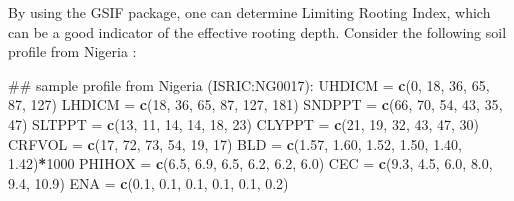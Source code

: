 \documentclass[11pt]{krantz}
\newenvironment{Shaded}{\begin{snugshade}}{\end{snugshade}}
\newcommand{\DecValTok}[1]{\textcolor[rgb]{0.06,0.06,0.06}{#1}}
\newcommand{\FloatTok}[1]{\textcolor[rgb]{0.06,0.06,0.06}{#1}}
\newcommand{\KeywordTok}[1]{\textcolor[rgb]{0.27,0.27,0.27}{\textbf{#1}}}
\newcommand{\NormalTok}[1]{#1}
\newcommand{\OperatorTok}[1]{\textcolor[rgb]{0.43,0.43,0.43}{\textbf{#1}}}
\newcommand{\StringTok}[1]{\textcolor[rgb]{0.5,0.5,0.5}{#1}}
\theoremstyle{definition}
\theoremstyle{definition}
\theoremstyle{definition}
\theoremstyle{remark}
\begin{document}
By using the GSIF package, one can determine Limiting Rooting Index,
which can be a good indicator of the effective rooting depth. Consider
the following soil profile from Nigeria \citep{Leenaars2012}:

\begin{Shaded}
\begin{Highlighting}[]
\NormalTok{## sample profile from Nigeria (ISRIC:NG0017):}
\NormalTok{UHDICM =}\StringTok{ }\KeywordTok{c}\NormalTok{(}\DecValTok{0}\NormalTok{, }\DecValTok{18}\NormalTok{, }\DecValTok{36}\NormalTok{, }\DecValTok{65}\NormalTok{, }\DecValTok{87}\NormalTok{, }\DecValTok{127}\NormalTok{)}
\NormalTok{LHDICM =}\StringTok{ }\KeywordTok{c}\NormalTok{(}\DecValTok{18}\NormalTok{, }\DecValTok{36}\NormalTok{, }\DecValTok{65}\NormalTok{, }\DecValTok{87}\NormalTok{, }\DecValTok{127}\NormalTok{, }\DecValTok{181}\NormalTok{)}
\NormalTok{SNDPPT =}\StringTok{ }\KeywordTok{c}\NormalTok{(}\DecValTok{66}\NormalTok{, }\DecValTok{70}\NormalTok{, }\DecValTok{54}\NormalTok{, }\DecValTok{43}\NormalTok{, }\DecValTok{35}\NormalTok{, }\DecValTok{47}\NormalTok{)}
\NormalTok{SLTPPT =}\StringTok{ }\KeywordTok{c}\NormalTok{(}\DecValTok{13}\NormalTok{, }\DecValTok{11}\NormalTok{, }\DecValTok{14}\NormalTok{, }\DecValTok{14}\NormalTok{, }\DecValTok{18}\NormalTok{, }\DecValTok{23}\NormalTok{)}
\NormalTok{CLYPPT =}\StringTok{ }\KeywordTok{c}\NormalTok{(}\DecValTok{21}\NormalTok{, }\DecValTok{19}\NormalTok{, }\DecValTok{32}\NormalTok{, }\DecValTok{43}\NormalTok{, }\DecValTok{47}\NormalTok{, }\DecValTok{30}\NormalTok{)}
\NormalTok{CRFVOL =}\StringTok{ }\KeywordTok{c}\NormalTok{(}\DecValTok{17}\NormalTok{, }\DecValTok{72}\NormalTok{, }\DecValTok{73}\NormalTok{, }\DecValTok{54}\NormalTok{, }\DecValTok{19}\NormalTok{, }\DecValTok{17}\NormalTok{)}
\NormalTok{BLD =}\StringTok{ }\KeywordTok{c}\NormalTok{(}\FloatTok{1.57}\NormalTok{, }\FloatTok{1.60}\NormalTok{, }\FloatTok{1.52}\NormalTok{, }\FloatTok{1.50}\NormalTok{, }\FloatTok{1.40}\NormalTok{, }\FloatTok{1.42}\NormalTok{)}\OperatorTok{*}\DecValTok{1000}
\NormalTok{PHIHOX =}\StringTok{ }\KeywordTok{c}\NormalTok{(}\FloatTok{6.5}\NormalTok{, }\FloatTok{6.9}\NormalTok{, }\FloatTok{6.5}\NormalTok{, }\FloatTok{6.2}\NormalTok{, }\FloatTok{6.2}\NormalTok{, }\FloatTok{6.0}\NormalTok{)}
\NormalTok{CEC =}\StringTok{ }\KeywordTok{c}\NormalTok{(}\FloatTok{9.3}\NormalTok{, }\FloatTok{4.5}\NormalTok{, }\FloatTok{6.0}\NormalTok{, }\FloatTok{8.0}\NormalTok{, }\FloatTok{9.4}\NormalTok{, }\FloatTok{10.9}\NormalTok{)}
\NormalTok{ENA =}\StringTok{ }\KeywordTok{c}\NormalTok{(}\FloatTok{0.1}\NormalTok{, }\FloatTok{0.1}\NormalTok{, }\FloatTok{0.1}\NormalTok{, }\FloatTok{0.1}\NormalTok{, }\FloatTok{0.1}\NormalTok{, }\FloatTok{0.2}\NormalTok{)}

\end{Highlighting}
\end{Shaded}
\end{document}
